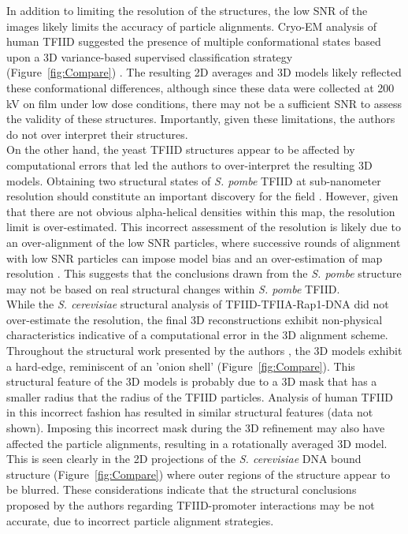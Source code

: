 \indent In addition to limiting the resolution of the structures, the low SNR of the images likely limits the accuracy of particle alignments. Cryo-EM analysis of human TFIID suggested the presence of multiple conformational states based upon a 3D variance-based supervised classification strategy (Figure~\ref{fig:Compare}) \cite{Grob_1281}. The resulting 2D averages and 3D models likely reflected these conformational differences, although since these data were collected at 200 kV on film under low dose conditions, there may not be a sufficient SNR to assess the validity of these structures. Importantly, given these limitations, the authors do not over interpret their structures. \\
\indent On the other hand, the yeast TFIID structures \cite{Elmlund_691,Papai_539} appear to be affected by computational errors that led the authors to over-interpret the resulting 3D models. Obtaining two structural states of \emph{S. pombe} TFIID at sub-nanometer resolution should constitute an important discovery for the field \cite{Elmlund_691}. However, given that there are not obvious alpha-helical densities within this map, the resolution limit is over-estimated. This incorrect assessment of the resolution is likely due to an over-alignment of the low SNR particles, where successive rounds of alignment with low SNR particles can impose model bias and an over-estimation of map resolution \cite{Stewart_2004}. This suggests that the conclusions drawn from the \emph{S. pombe} structure may not be based on real structural changes within \emph{S. pombe} TFIID. \\
\indent While the \emph{S. cerevisiae} structural analysis of TFIID-TFIIA-Rap1-DNA did not over-estimate the resolution, the final 3D reconstructions exhibit non-physical characteristics indicative of a computational error in the 3D alignment scheme. Throughout the structural work presented by the authors \cite{Papai_539,Papai_418}, the 3D models exhibit a hard-edge, reminiscent of an 'onion shell' (Figure~\ref{fig:Compare}). This structural feature of the 3D models is probably due to a 3D mask that has a smaller radius that the radius of the TFIID particles. Analysis of human TFIID in this incorrect fashion has resulted in similar structural features (data not shown). Imposing this incorrect mask during the 3D refinement may also have affected the particle alignments, resulting in a rotationally averaged 3D model. This is seen clearly in the 2D projections of the \emph{S. cerevisiae} DNA bound structure (Figure~\ref{fig:Compare}) where outer regions of the structure appear to be blurred. These considerations indicate that the structural conclusions proposed by the authors regarding TFIID-promoter interactions may be not accurate, due to incorrect particle alignment strategies.\\


